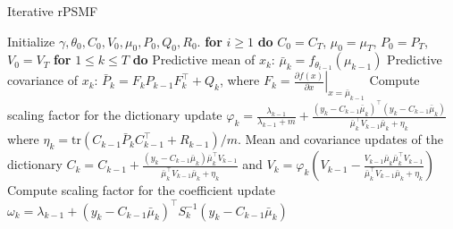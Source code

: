 \documentclass{mldsmsc}
\begin{document}
\begin{algorithm}[h]
\caption{Iterative rPSMF}
\begin{algorithmic}[1]
\State Initialize $\gamma, \theta_0, C_0, V_0, \mu_0, P_0, Q_0, R_0$.
\State \textbf{for} $i \geq 1$ \textbf{do}
\State \hspace{1em} $C_0 = C_T$, $\mu_0 = \mu_T$, $P_0 = P_T$, $V_0 = V_T$
\State \hspace{1em} \textbf{for} $1 \leq k \leq T$ \textbf{do}
\State \hspace{2em} Predictive mean of $x_k$:
\State \hspace{3em} $\bar{\mu}_k = f_{\theta_{i-1}}(\mu_{k-1})$
\State \hspace{2em} Predictive covariance of $x_k$:
\State \hspace{3em} $\bar{P}_k = F_k P_{k-1} F_k^\top + Q_k$, \hspace{1em} where \hspace{1em} $F_k = \left. \frac{\partial f(x)}{\partial x} \right|_{x=\bar{\mu}_{k-1}}$
\State \hspace{2em} Compute scaling factor for the dictionary update
\State \hspace{3em} $\varphi_k = \frac{\lambda_{k-1}}{\lambda_{k-1} + m} + \frac{(y_k - C_{k-1} \bar{\mu}_k)^\top (y_k - C_{k-1} \bar{\mu}_k)}{\bar{\mu}_k^\top V_{k-1} \bar{\mu}_k + \eta_k}$
\State \hspace{2em} where $\eta_k = \text{tr}(C_{k-1} \bar{P}_k C_{k-1}^\top + R_{k-1}) / m$.
\State \hspace{2em} Mean and covariance updates of the dictionary
\State \hspace{3em} $C_k = C_{k-1} + \frac{(y_k - C_{k-1} \bar{\mu}_k) \bar{\mu}_k^\top V_{k-1}}{\bar{\mu}_k^\top V_{k-1} \bar{\mu}_k + \eta_k}$ and \hspace{1em} $V_k = \varphi_k \left( V_{k-1} - \frac{V_{k-1} \bar{\mu}_k \bar{\mu}_k^\top V_{k-1}}{\bar{\mu}_k^\top V_{k-1} \bar{\mu}_k + \eta_k} \right)$
\State \hspace{2em} Compute scaling factor for the coefficient update
\State \hspace{3em} $\omega_k = \lambda_{k-1} + (y_k - C_{k-1} \bar{\mu}_k)^\top S_k^{-1} (y_k - C_{k-1} \bar{\mu}_k)$


\end{algorithmic}
\end{algorithm}
\end{document}
